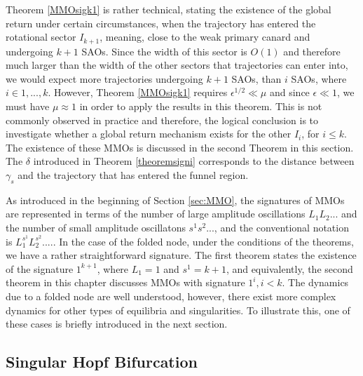 Theorem \ref{MMOsigk1} is rather technical, stating the existence of the global return under certain circumstances, when the trajectory has entered the rotational sector $I_{k+1}$, meaning, close to the weak primary canard and undergoing $k+1$ SAOs. Since the width of this sector is $O(1)$ and therefore much larger than the width of the other sectors that trajectories can enter into, we would expect more trajectories undergoing $k+1$ SAOs, than $i$ SAOs, where $i \in 1,...,k$.
However, Theorem \ref{MMOsigk1} requires $\epsilon^{1/2} \ll \mu$ and since $\epsilon \ll 1$, we must have $\mu \approx 1$ in order to apply the results in this theorem. This is not commonly observed in practice and therefore, the logical conclusion is to investigate whether a global return mechanism exists for the other $I_i$, for $i \leq k$. The existence of these MMOs is discussed in the second Theorem in this section. The $\delta$ introduced in Theorem \ref{theoremsigni} corresponds to the distance between 
$\gamma_s$ and the trajectory that has entered the funnel region.

As introduced in the beginning of Section \ref{sec:MMO},  the signatures of MMOs are represented in terms of the number of large amplitude oscillations $L_1L_2...$ and the number of small amplitude oscillatons $s^1s^2...$, and the conventional notation is $L_1^{s^1}L_2^{s^2}....$.
In the case of the folded node, under the conditions of the theorems, we have a rather straightforward signature. The first theorem states the existence of the signature $1^{k+1}$, where $L_1=1$ and $s^1=k+1$, and equivalently, the second theorem in this chapter discusses MMOs with signature $1^{i}, i<k$.
The dynamics due to a folded node are well understood, however, there exist more complex dynamics for other types of equilibria and singularities.
To illustrate this, one of these cases is briefly introduced in the next section. 


\subsection{Singular Hopf Bifurcation}

